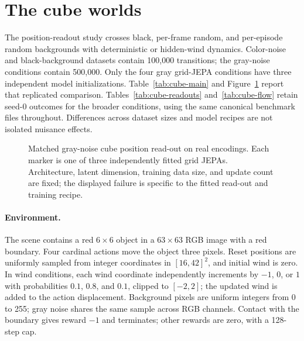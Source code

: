 \section{The cube worlds}
\label{app:cubes}

The position-readout study crosses black, per-frame random, and per-episode random backgrounds
with deterministic or hidden-wind dynamics. Color-noise and black-background datasets contain
100,000 transitions; the gray-noise conditions contain 500,000. Only the four gray grid-JEPA
conditions have three independent model initializations. Table~\ref{tab:cube-main} and
Figure~\ref{fig:cube-readout} report that replicated comparison. Tables~\ref{tab:cube-readouts}
and~\ref{tab:cube-flow} retain seed-0 outcomes for the broader conditions, using the same canonical
benchmark files throughout. Differences across dataset sizes and model recipes are not isolated
nuisance effects.

\begin{figure}[t]
\centering
{}
\caption{Matched gray-noise cube position read-out on real encodings. Each marker is one of three
independently fitted grid JEPAs. Architecture, latent dimension, training data size, and update count
are fixed; the displayed failure is specific to the fitted read-out and training recipe.}
\label{fig:cube-readout}
\end{figure}

\paragraph{Environment.}
The scene contains a red $6\times6$ object in a $63\times63$ RGB image with a red boundary. Four
cardinal actions move the object three pixels. Reset positions are uniformly sampled from integer
coordinates in $[16,42]^2$, and initial wind is zero. In wind conditions, each wind coordinate
independently increments by $-1$, $0$, or $1$ with probabilities $0.1$, $0.8$, and $0.1$, clipped
to $[-2,2]$; the updated wind is added to the action displacement. Background pixels are uniform
integers from 0 to 255; gray noise shares the same sample across RGB channels. Contact with the
boundary gives reward $-1$ and terminates; other rewards are zero, with a 128-step cap.

